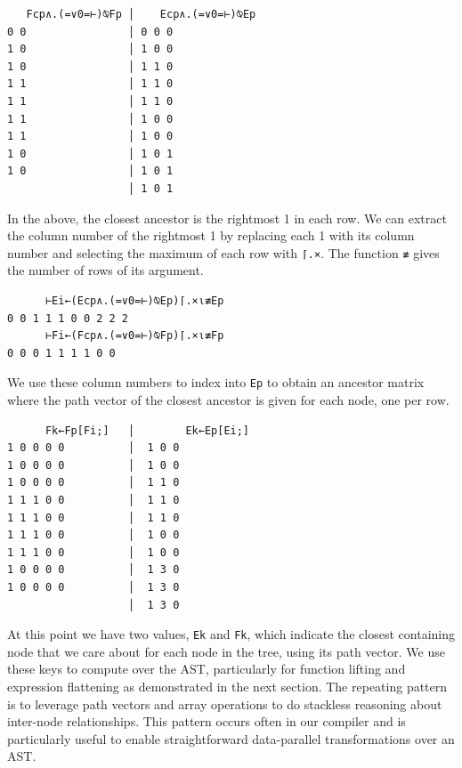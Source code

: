 ﻿\documentclass[numbers,10pt,preprint]{sigplanconf}
\begin{document}
\begin{verbatim}
   Fcp∧.(=∨0=⊢)⍉Fp │    Ecp∧.(=∨0=⊢)⍉Ep
0 0                │ 0 0 0
1 0                │ 1 0 0
1 0                │ 1 1 0
1 1                │ 1 1 0
1 1                │ 1 1 0
1 1                │ 1 0 0
1 1                │ 1 0 0
1 0                │ 1 0 1
1 0                │ 1 0 1
                   │ 1 0 1
\end{verbatim}

\noindent In the above, the closest ancestor is the rightmost 1 in each row. We can extract the column number of the rightmost 1 by replacing each 1 with its column number and selecting the maximum of each row with \verb;⌈.×;. The function \verb;≢; gives the number of rows of its argument.

\begin{verbatim}
      ⊢Ei←(Ecp∧.(=∨0=⊢)⍉Ep)⌈.×⍳≢Ep
0 0 1 1 1 0 0 2 2 2
      ⊢Fi←(Fcp∧.(=∨0=⊢)⍉Fp)⌈.×⍳≢Fp
0 0 0 1 1 1 1 0 0
\end{verbatim}

\noindent We use these column numbers to index into \verb;Ep; to obtain an ancestor matrix where the path vector of the closest ancestor is given for each node, one per row.

\begin{verbatim}
      Fk←Fp[Fi;]   │        Ek←Ep[Ei;]
1 0 0 0 0          │  1 0 0
1 0 0 0 0          │  1 0 0
1 0 0 0 0          │  1 1 0
1 1 1 0 0          │  1 1 0
1 1 1 0 0          │  1 1 0
1 1 1 0 0          │  1 0 0
1 1 1 0 0          │  1 0 0
1 0 0 0 0          │  1 3 0
1 0 0 0 0          │  1 3 0
                   │  1 3 0
\end{verbatim}

\noindent At this point we have two values, \verb;Ek; and \verb;Fk;, which indicate the closest containing node that we care about for each node in the tree, using its path vector. We use these keys to compute over the AST, particularly for function lifting and expression flattening as demonstrated in the next section. The repeating pattern is to leverage path vectors and array operations to do stackless reasoning about inter-node relationships. This pattern occurs often in our compiler and is particularly useful to enable straightforward data-parallel transformations over an AST.
\end{document}
